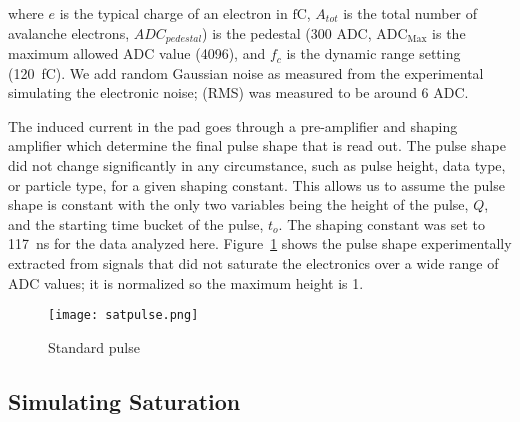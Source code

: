 where $e$ is the typical charge of an electron in $\si{\femto \coulomb}$, $A_{tot}$ is the total number of avalanche electrons, $ADC_{pedestal}$) is the pedestal (300 ADC, $\mathrm{ADC_{Max}}$ is the maximum allowed ADC value (4096), and $f_c$ is the dynamic range setting (\SI{120}{\femto\coulomb}). We add random Gaussian noise as measured from the experimental simulating the electronic noise; (RMS) was measured to be around 6 ADC. 

The induced current in the pad goes through a pre-amplifier and shaping amplifier which determine the final pulse shape that is read out. The pulse shape did not change significantly in any circumstance, such as pulse height, data type, or particle type, for a given shaping constant. This allows us to assume the pulse shape is constant with the only two variables being the height of the pulse, $Q$, and the starting time bucket of the pulse, $t_o$. The shaping constant was set to \SI{117}{\nano\second} for the data analyzed here. Figure~\ref{fig:pulseshape} shows the pulse shape experimentally extracted from signals that did not saturate the electronics over a wide range of ADC values; it is normalized so the maximum height is 1. 



\begin{figure}[!htb]
    \centering       
    \texttt{[image: satpulse.png]} 
    \caption{Standard pulse }
    \label{fig:pulseshape}
\end{figure}


\subsection{Simulating Saturation}



